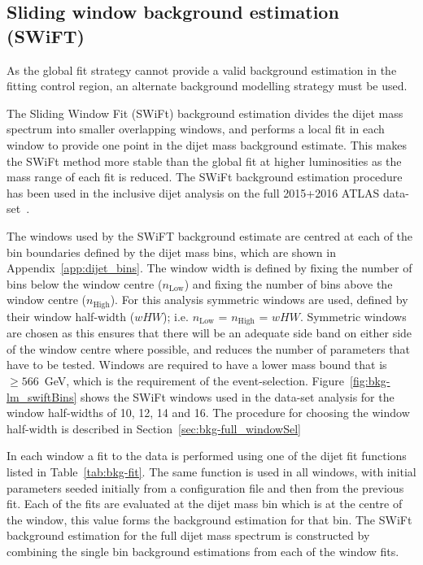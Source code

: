 \newpage
\subsection{Sliding window background estimation (SWiFT)}\label{sec:bkg-full_swift}

As the global fit strategy cannot provide a valid background estimation in the
\lm{} fitting control region, an alternate background modelling strategy must be used.

The Sliding Window Fit (SWiFt) background estimation divides the dijet mass spectrum into smaller overlapping windows,
and performs a local fit in each window to provide one point in the dijet mass background estimate.
This makes the SWiFt method more stable than the global fit at higher luminosities as the mass range of each fit is reduced.
The SWiFt background estimation procedure has been used in the inclusive dijet analysis on the full 2015+2016 ATLAS data-set~\cite{dijet-mori17_paper}.

The windows used by the SWiFT background estimate are centred at each of the
bin boundaries defined by the dijet mass bins, which are shown in Appendix~\ref{app:dijet_bins}.
The window width is defined by fixing the number of bins below the window centre ($n_{\text{Low}}$)
and fixing the number of bins above the window centre ($n_{\text{High}}$).
For this analysis symmetric windows are used, defined by their window half-width ($wHW$); i.e. $n_{\text{Low}}$ = $n_{\text{High}}$ = $wHW$.
Symmetric windows are chosen as this ensures that there will be an adequate side band on either side of the window centre where possible,
and reduces the number of parameters that have to be tested.
Windows are required to have a lower mass bound that is $\geq566$~GeV, which is the \mjj{} requirement of the event-selection.
Figure~\ref{fig:bkg-lm_swiftBins} shows the SWiFt windows used in the \lm{} data-set analysis for the window half-widths of 10, 12, 14 and 16.
The procedure for choosing the window half-width is described in Section~\ref{sec:bkg-full_windowSel}

In each window a fit to the data is performed using one of the dijet fit functions listed in Table~\ref{tab:bkg-fit}.
The same function is used in all windows, with initial parameters seeded initially from a configuration file and then from the previous fit.
Each of the fits are evaluated at the dijet mass bin which is at the centre of the window, this value forms the background estimation for that bin.
The SWiFt background estimation for the full dijet mass spectrum is constructed by combining the single bin background estimations from each of the window fits.

